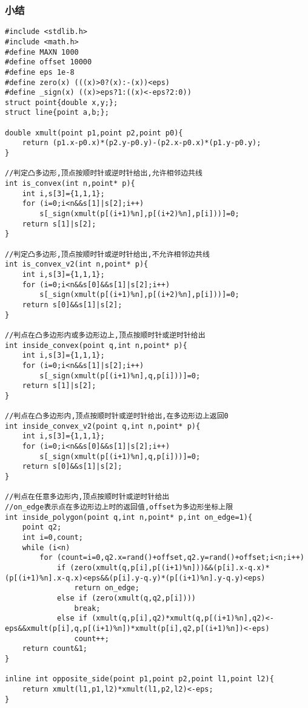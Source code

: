 \documentclass[a4]{article}
\begin{document}
\subsubsection{小结}
\begin{lstlisting}
#include <stdlib.h>
#include <math.h>
#define MAXN 1000
#define offset 10000
#define eps 1e-8
#define zero(x) (((x)>0?(x):-(x))<eps)
#define _sign(x) ((x)>eps?1:((x)<-eps?2:0))
struct point{double x,y;};
struct line{point a,b;};
 
double xmult(point p1,point p2,point p0){
    return (p1.x-p0.x)*(p2.y-p0.y)-(p2.x-p0.x)*(p1.y-p0.y);
}
 
//判定凸多边形,顶点按顺时针或逆时针给出,允许相邻边共线
int is_convex(int n,point* p){
    int i,s[3]={1,1,1};
    for (i=0;i<n&&s[1]|s[2];i++)
        s[_sign(xmult(p[(i+1)%n],p[(i+2)%n],p[i]))]=0;
    return s[1]|s[2];
}
 
//判定凸多边形,顶点按顺时针或逆时针给出,不允许相邻边共线
int is_convex_v2(int n,point* p){
    int i,s[3]={1,1,1};
    for (i=0;i<n&&s[0]&&s[1]|s[2];i++)
        s[_sign(xmult(p[(i+1)%n],p[(i+2)%n],p[i]))]=0;
    return s[0]&&s[1]|s[2];
}
 
//判点在凸多边形内或多边形边上,顶点按顺时针或逆时针给出
int inside_convex(point q,int n,point* p){
    int i,s[3]={1,1,1};
    for (i=0;i<n&&s[1]|s[2];i++)
        s[_sign(xmult(p[(i+1)%n],q,p[i]))]=0;
    return s[1]|s[2];
}
 
//判点在凸多边形内,顶点按顺时针或逆时针给出,在多边形边上返回0
int inside_convex_v2(point q,int n,point* p){
    int i,s[3]={1,1,1};
    for (i=0;i<n&&s[0]&&s[1]|s[2];i++)
        s[_sign(xmult(p[(i+1)%n],q,p[i]))]=0;
    return s[0]&&s[1]|s[2];
}
 
//判点在任意多边形内,顶点按顺时针或逆时针给出
//on_edge表示点在多边形边上时的返回值,offset为多边形坐标上限
int inside_polygon(point q,int n,point* p,int on_edge=1){
    point q2;
    int i=0,count;
    while (i<n)
        for (count=i=0,q2.x=rand()+offset,q2.y=rand()+offset;i<n;i++)
            if (zero(xmult(q,p[i],p[(i+1)%n]))&&(p[i].x-q.x)*(p[(i+1)%n].x-q.x)<eps&&(p[i].y-q.y)*(p[(i+1)%n].y-q.y)<eps)
                return on_edge;
            else if (zero(xmult(q,q2,p[i])))
                break;
            else if (xmult(q,p[i],q2)*xmult(q,p[(i+1)%n],q2)<-eps&&xmult(p[i],q,p[(i+1)%n])*xmult(p[i],q2,p[(i+1)%n])<-eps)
                count++;
    return count&1;
}
 
inline int opposite_side(point p1,point p2,point l1,point l2){
    return xmult(l1,p1,l2)*xmult(l1,p2,l2)<-eps;
}
 

\end{lstlisting}
\end{document}
